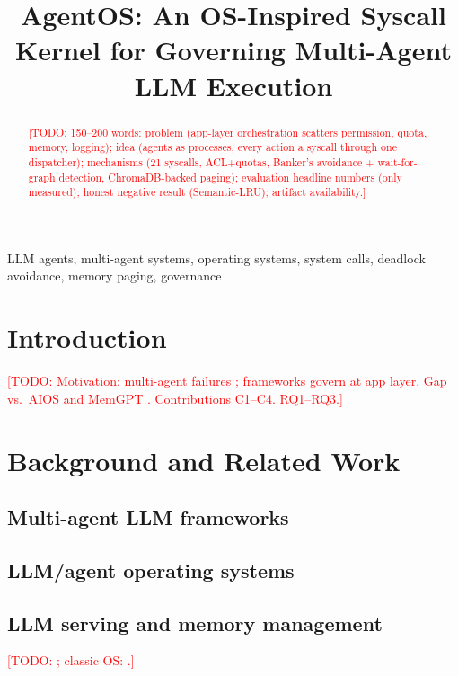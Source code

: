 \documentclass[conference,letterpaper]{IEEEtran}
\newcommand{\todo}[1]{\textcolor{red}{[TODO: #1]}}
\begin{document}
\title{AgentOS: An OS-Inspired Syscall Kernel for Governing Multi-Agent LLM Execution}
\author{}
\maketitle

\begin{abstract}
\todo{150--200 words: problem (app-layer orchestration scatters permission, quota, memory, logging); idea (agents as processes, every action a syscall through one dispatcher); mechanisms (21 syscalls, ACL+quotas, Banker's avoidance + wait-for-graph detection, ChromaDB-backed paging); evaluation headline numbers (only measured); honest negative result (Semantic-LRU); artifact availability.}
\end{abstract}
\begin{IEEEkeywords}
LLM agents, multi-agent systems, operating systems, system calls, deadlock avoidance, memory paging, governance
\end{IEEEkeywords}

\section{Introduction}\label{sec:intro}
\todo{Motivation: multi-agent failures \cite{cemri2025mas}; frameworks \cite{wu2023autogen,hong2024metagpt,langgraph,crewai} govern at app layer. Gap vs.\ AIOS \cite{mei2025aios} and MemGPT \cite{packer2023memgpt}. Contributions C1--C4. RQ1--RQ3.}

\section{Background and Related Work}\label{sec:related}
\subsection{Multi-agent LLM frameworks}
\subsection{LLM/agent operating systems}
\subsection{LLM serving and memory management}
\todo{\cite{kwon2023vllm,lin2024parrot}; classic OS: \cite{dijkstra1965bankers,belady1966}.}
\end{document}
